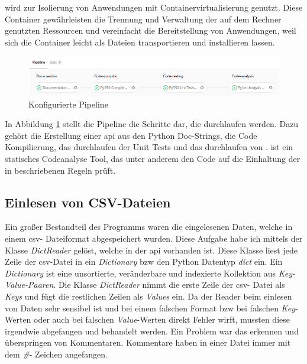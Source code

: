  wird zur Isolierung von Anwendungen mit Containervirtualisierung 
genutzt. Diese Container gewährleisten die Trennung und Verwaltung der auf dem Rechner 
genutzten Ressourcen und vereinfacht die Bereitstellung von Anwendungen, weil sich die 
Container leicht als Dateien transportieren und installieren lassen.

\begin{figure}[H]
	\centering
	\includegraphics[width=1\textwidth, height=0.2\textwidth]{graphics/pipeline.png}
	\caption{Konfigurierte Pipeline}
	\label{fig:pipeline}
\end{figure}

In Abbildung \ref{fig:pipeline} stellt die Pipeline die Schritte dar, die durchlaufen werden.
Dazu gehört die Erstellung einer \ac{api} aus den Python Doc-Strings, die Code Kompilierung, 
das durchlaufen der Unit Tests und das durchlaufen von . 
 ist ein statisches Codeanalyse Tool, das unter anderem den Code auf 
die Einhaltung der in  beschriebenen Regeln prüft.


\subsection{Einlesen von CSV-Dateien}
\label{subsec:read_csv}

Ein großer Bestandteil des Programms waren die eingelesenen Daten, welche in einem \ac{csv}-
Dateiformat abgespeichert wurden. Diese Aufgabe habe ich mittels der Klasse \textit{DictReader} 
gelöst, welche in der  \ac{api} vorhanden ist. Diese Klasse liest jede 
Zeile der \ac{csv}-Datei in ein \textit{Dictionary} \ac{bzw} den Python Datentyp \textit{dict} 
ein. Ein \textit{Dictionary} ist eine unsortierte, veränderbare und indexierte Kollektion aus 
\textit{Key-Value-Paaren}. Die Klasse \textit{DictReader} nimmt die erste Zeile der \ac{csv}-
Datei als \textit{Keys} und fügt die restlichen Zeilen als \textit{Values} ein. 
Da der Reader beim einlesen von Daten sehr sensibel ist und bei einem falschen Format \ac{bzw} 
bei falschen \textit{Key}-Werten oder auch bei falschen \textit{Value}-Werten direkt Fehler 
wirft, mussten diese irgendwie abgefangen und behandelt werden. Ein Problem war das erkennen 
und überspringen von Kommentaren. Kommentare haben in einer Datei immer mit dem \textit{\#}-
Zeichen angefangen. 

